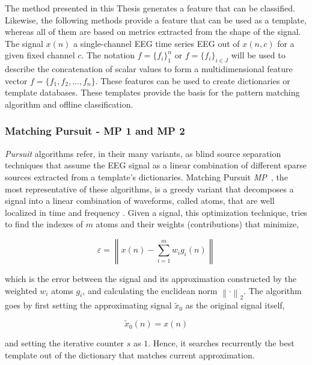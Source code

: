 The method presented in this Thesis generates a feature that can be classified.  Likewise, the following methods provide a feature that can be used as a template, whereas all of them are based on metrics extracted from the shape of the signal.  The signal $x(n)$ a single-channel EEG time series EEG out of $x(n,c)$ for a given fixed channel $c$.  The notation $f=\{f_i\}_{1}^{n} $ or $f=\{f_i\}_{i \in J}^{} $  will be used to describe the concatenation of scalar values to form a multidimensional feature vector $f=\{f_1,f_2,...,f_n\}$. These features can be used to create dictionaries or template databases.  These templates provide the basis for the pattern matching algorithm and offline classification. 

\subsubsection{Matching Pursuit - MP 1 and MP 2}

\textit{Pursuit} algorithms refer, in their many variants, as blind source separation \cite{Vincent2010} techniques that assume the EEG signal as a linear combination of different sparse sources extracted from a template's dictionaries.  Matching Pursuit \textit{MP}~\cite{Mallat1993}, the most representative of these algorithms, is a greedy variant that decomposes a signal into a linear combination of waveforms, called atoms, that are well localized in time and frequency \cite{ChandranKS2016}.  Given a signal, this optimization technique, tries to find the indexes of $m$ atoms and their weights (contributions) that minimize,


\begin{equation}
\varepsilon =  \left\lVert   x(n) - \sum_{i=1}^{m} w_i g_{i}(n)   \right\rVert
\label{eq:mperror}
\end{equation}

\noindent which is the error between the signal and its approximation constructed by the weighted $w_i$ atoms $g_{i}$, and calculating the euclidean norm ${\left\lVert \cdot \right\rVert}_{2}$.  The algorithm goes by first setting the approximating signal $\tilde{x}_{0}$  as the original signal itself,  

\begin{equation}
\tilde{x}_{0}(n) = x(n)
\label{eq:mp2}
\end{equation}

\noindent and setting the iterative counter $s$ as $1$. Hence, it searches recurrently the best template out of the dictionary  that matches current approximation.  

